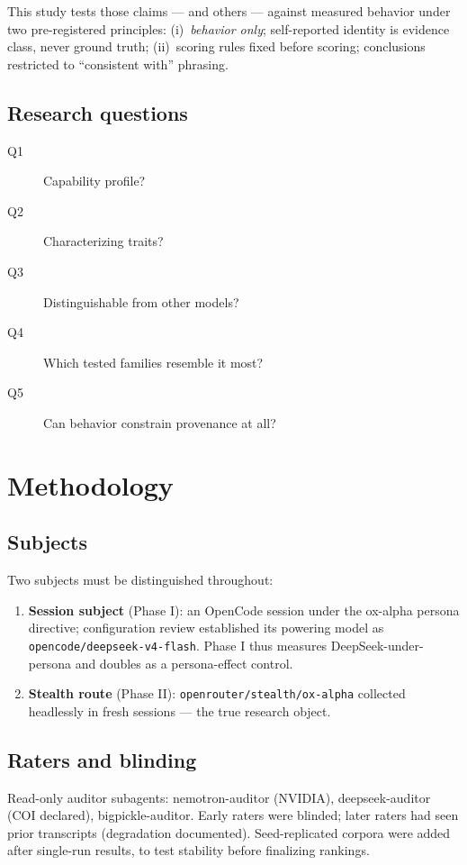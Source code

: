 \documentclass[11pt,a4paper]{article}
\begin{document}
This study tests those claims --- and others --- against measured behavior under two pre-registered principles: (i)~\emph{behavior only}; self-reported identity is evidence class, never ground truth; (ii)~scoring rules fixed before scoring; conclusions restricted to ``consistent with'' phrasing.

\subsection{Research questions}
\begin{description}
\item[Q1] Capability profile? \item[Q2] Characterizing traits? \item[Q3] Distinguishable from other models? \item[Q4] Which tested families resemble it most? \item[Q5] Can behavior constrain provenance at all?
\end{description}

\section{Methodology}

\subsection{Subjects}
Two subjects must be distinguished throughout:
\begin{enumerate}
\item \textbf{Session subject} (Phase I): an OpenCode session under the ox-alpha persona directive; configuration review established its powering model as \texttt{opencode/deepseek-v4-flash}. Phase I thus measures DeepSeek-under-persona and doubles as a persona-effect control.
\item \textbf{Stealth route} (Phase II): \texttt{openrouter/stealth/ox-alpha} collected headlessly in fresh sessions --- the true research object.
\end{enumerate}

\subsection{Raters and blinding}
Read-only auditor subagents: nemotron-auditor (NVIDIA), deepseek-auditor (COI declared), bigpickle-auditor. Early raters were blinded; later raters had seen prior transcripts (degradation documented). Seed-replicated corpora were added after single-run results, to test stability before finalizing rankings.
\end{document}
